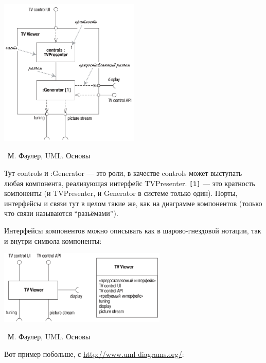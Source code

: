 \documentclass[a5paper]{article}
\newcommand{\attribution}[1] {
	\vspace{-5mm}\begin{flushright}\begin{scriptsize}%
	{\textcopyright\, #1}\end{scriptsize}\end{flushright}
}
\begin{document}
\begin{center}
	\includegraphics[width=0.5\textwidth]{compositeStructureDiagram.png}
	\attribution{М. Фаулер, UML. Основы}
\end{center}

Тут controls и :Generator --- это роли, в качестве controls может выступать любая компонента, реализующая интерфейс TVPresenter. \verb|[1]| --- это кратность компоненты (и TVPresenter, и Generator в системе только один). Порты, интерфейсы и связи тут в целом такие же, как на диаграмме компонентов (только что связи называются ``разьёмами'').

Интерфейсы компонентов можно описывать как в шарово-гнездовой нотации, так и внутри символа компоненты:

\begin{center}
	\includegraphics[width=0.6\textwidth]{compositeStructureElement.png}
	\attribution{М. Фаулер, UML. Основы}
\end{center}

Вот пример побольше, с \url{http://www.uml-diagrams.org/}:
\end{document}
